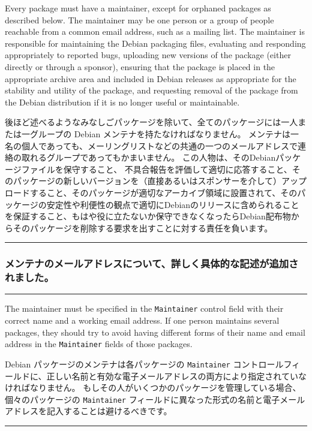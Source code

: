 \documentclass[mingoth,a4paper]{jsarticle}
\begin{document}
\par
\parbox[t]{0.46\linewidth}{
	  Every package must have a maintainer, except for orphaned
	  packages as described below.  The maintainer may be one person
	  or a group of people reachable from a common email address, such
	  as a mailing list.  The maintainer is responsible for
	  maintaining the Debian packaging files, evaluating and
	  responding appropriately to reported bugs, uploading new
	  versions of the package (either directly or through a sponsor),
	  ensuring that the package is placed in the appropriate archive
	  area and included in Debian releases as appropriate for the
	  stability and utility of the package, and requesting removal of
	  the package from the Debian distribution if it is no longer
	  useful or maintainable.
}\hfil
\parbox[t]{0.46\linewidth}{
	    後ほど述べるようなみなしごパッケージを除いて、全てのパッケージには一人または一グループの Debian メンテナを持たなければなりません。
メンテナは一名の個人であっても、メーリングリストなどの共通の一つのメールアドレスで連絡の取れるグループであってもかまいません。
	    この人物は、そのDebianパッケージファイルを保守すること、
	    不具合報告を評価して適切に応答すること、そのパッケージの新しいバージョンを（直接あるいはスポンサーを介して）アップロードすること、そのパッケージが適切なアーカイブ領域に設置されて、そのパッケージの安定性や利便性の観点で適切にDebianのリリースに含められることを保証すること、もはや役に立たないか保守できなくなったらDebian配布物からそのパッケージを削除する要求を出すことに対する責任を負います。
}
\hrule

\clearpage

\subsubsection{メンテナのメールアドレスについて、詳しく具体的な記述が追加されました。}

\vspace{1ex}
\hrule
{}\par
\parbox[t]{0.48\linewidth}{
 	    The maintainer must be specified in the
	    {\tt Maintainer} control field with their correct name
	    and a working email address.  If one person maintains
	    several packages, they should try to avoid having
	    different forms of their name and email address in
	    the {\tt Maintainer} fields of those packages.
}\hfil
\parbox[t]{0.48\linewidth}{
	    Debian パッケージのメンテナは各パッケージの {\tt Maintainer}
	    コントロールフィールドに、正しい名前と有効な電子メールアドレスの両方により指定されていなければなりません。
	    もしその人がいくつかのパッケージを管理している場合、個々のパッケージの
	    {\tt Maintainer} フィールドに異なった形式の名前と電子メールアドレスを記入することは避けるべきです。
}
\hrule
\end{document}
